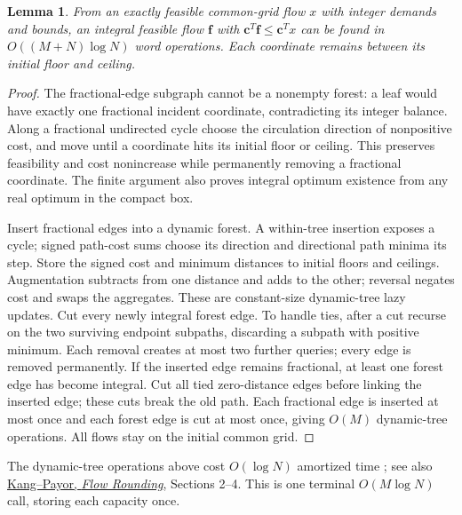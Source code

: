 \documentclass[11pt]{article}
\newtheorem{lemma}[theorem]{Lemma}
\theoremstyle{remark}
\newcommand{\cc}{\mathbf c}
\newcommand{\ff}{\mathbf f}
\begin{document}
\begin{lemma}\label{lem:ram27-round}
From an exactly feasible common-grid flow $x$ with integer demands and bounds,
an integral feasible flow $\ff$ with $\cc^T\ff\le \cc^Tx$ can be found in $O((M+N)\log
N)$ word operations.
Each coordinate remains between its initial floor and ceiling.
\end{lemma} \begin{proof} The fractional-edge subgraph cannot be a nonempty
forest: a leaf would have exactly one fractional incident coordinate,
contradicting its integer balance.
Along a fractional undirected cycle choose the circulation direction of
nonpositive cost, and move until a coordinate hits its initial floor or ceiling.
This preserves feasibility and cost nonincrease while permanently removing a
fractional coordinate.
The finite argument also proves integral optimum existence from any real optimum
in the compact box.

Insert fractional edges into a dynamic forest.
A within-tree insertion exposes a cycle; signed path-cost sums choose its
direction and directional path minima its step.
Store the signed cost and minimum distances to initial floors and ceilings.
Augmentation subtracts from one distance and adds to the other; reversal negates
cost and swaps the aggregates.
These are constant-size dynamic-tree lazy updates.
Cut every newly integral forest edge.
To handle ties, after a cut recurse on the two surviving endpoint subpaths,
discarding a subpath with positive minimum.
Each removal creates at most two further queries; every edge is removed
permanently.
If the inserted edge remains fractional, at least one forest edge has become
integral.
Cut all tied zero-distance edges before linking the inserted edge; these cuts
break the old path.
Each fractional edge is inserted at most once and each forest edge is cut at
most once, giving $O(M)$ dynamic-tree operations.
All flows stay on the initial common grid.
\end{proof}

The dynamic-tree operations above cost $O(\log N)$ amortized time \cite[Sections
2--4]{ST83:journal}; see also
\href{https://arxiv.org/pdf/1507.08139}{Kang--Payor, \emph{Flow Rounding}},
Sections 2--4.
This is one terminal $O(M\log N)$ call, storing each capacity once.
\end{document}
